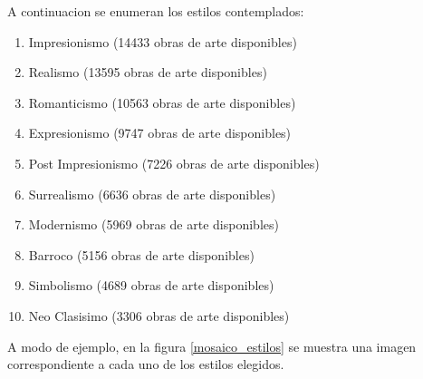 \documentclass[a4paper,11pt,spanish]{book}
\begin{document}
    A continuacion se enumeran los estilos contemplados:
    \begin{enumerate}
      \item Impresionismo  (14433 obras de arte disponibles)
      \item Realismo (13595 obras de arte disponibles)
      \item Romanticismo (10563 obras de arte disponibles)
      \item Expresionismo (9747 obras de arte disponibles)
      \item Post Impresionismo (7226 obras de arte disponibles)
      \item Surrealismo (6636 obras de arte disponibles)
      \item Modernismo (5969 obras de arte disponibles)
      \item Barroco (5156 obras de arte disponibles)
      \item Simbolismo (4689 obras de arte disponibles)
      \item Neo Clasisimo (3306 obras de arte disponibles)
    \end{enumerate}
      A modo de ejemplo, en la figura \ref{mosaico_estilos} se muestra una imagen correspondiente a cada uno de los estilos elegidos.
\end{document}
